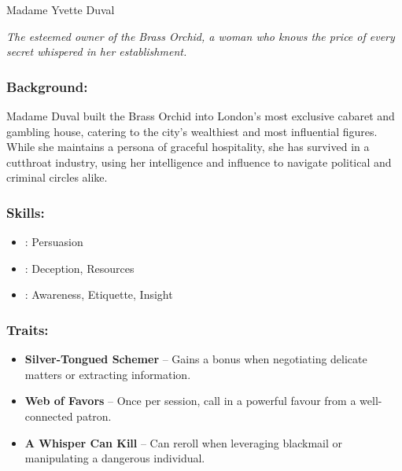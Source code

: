\begin{WyrdFullNPC}[%
		name=Madame Yvette Duval,%
		description=The Brass Orchid’s Matron,%
		float=!t%
	]{Madame Yvette Duval}
	
    \emph{The esteemed owner of the Brass Orchid, a woman who knows the price of every secret whispered in her establishment.}
    
    \subsubsection*{Background:}
     Madame Duval built the Brass Orchid into London’s most exclusive cabaret and gambling house, catering to the city’s wealthiest and most influential figures. While she maintains a persona of graceful hospitality, she has survived in a cutthroat industry, using her intelligence and influence to navigate political and criminal circles alike.
    
    \subsubsection*{Skills:}
    \begin{itemize}
       \item \Expert: Persuasion
        \item \Skilled: Deception, Resources
        \item \Novice: Awareness, Etiquette, Insight
    \end{itemize}
    
    \subsubsection*{Traits:}
    \begin{itemize}
        \item \textbf{Silver-Tongued Schemer} – Gains a bonus when negotiating delicate matters or extracting information.
        \item \textbf{Web of Favors} – Once per session, call in a powerful favour from a well-connected patron.
        \item \textbf{A Whisper Can Kill} – Can reroll when leveraging blackmail or manipulating a dangerous individual.
    \end{itemize}
\end{WyrdFullNPC}

